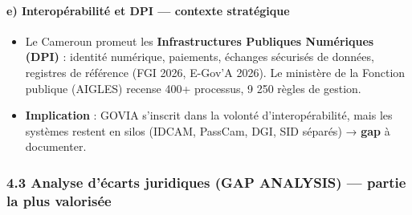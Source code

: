 \documentclass[
]{article}
\providecommand{\tightlist}{%
  \setlength{\itemsep}{0pt}\setlength{\parskip}{0pt}}
\begin{document}
\paragraph{e) Interopérabilité et DPI --- contexte
stratégique}\label{e-interopuxe9rabilituxe9-et-dpi-contexte-stratuxe9gique}

\begin{itemize}
\tightlist
\item
  Le Cameroun promeut les \textbf{Infrastructures Publiques Numériques
  (DPI)} : identité numérique, paiements, échanges sécurisés de données,
  registres de référence (FGI 2026, E-Gov'A 2026). Le ministère de la
  Fonction publique (AIGLES) recense 400+ processus, 9 250 règles de
  gestion.
\item
  \textbf{Implication} : GOVIA s'inscrit dans la volonté
  d'interopérabilité, mais les systèmes restent en silos (IDCAM,
  PassCam, DGI, SID séparés) → \textbf{gap} à documenter.
\end{itemize}

\subsubsection{\texorpdfstring{4.3 Analyse d'écarts juridiques (GAP
ANALYSIS) --- \textbf{partie la plus
valorisée}}{4.3 Analyse d'écarts juridiques (GAP ANALYSIS) --- partie la plus valorisée}}\label{analyse-duxe9carts-juridiques-gap-analysis-partie-la-plus-valorisuxe9e}
\end{document}
